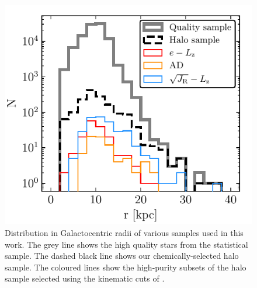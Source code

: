 \begin{figure}
    \centering
    \includegraphics[width=\linewidth]{figure/ch3/radius_histogram.pdf}
    \caption{Distribution in Galactocentric radii of various samples used in this work. The grey line shows the high quality stars from the statistical sample. The dashed black line shows our chemically-selected halo sample. The coloured lines show the high-purity \gse subsets of the halo sample selected using the kinematic cuts of \cite{lane22}.}
    \label{fig:radius_histogram}
\end{figure}

